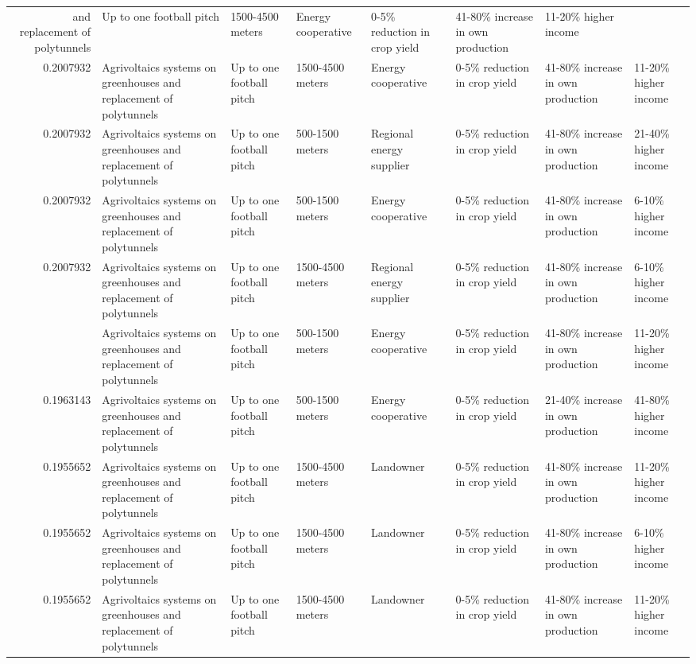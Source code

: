 \begin{table}
\begin{tabular}[t]{rlllllll}
and replacement of polytunnels & Up to one football pitch & 1500-4500 meters & Energy cooperative & 0-5\% reduction in crop yield & 41-80\% increase in own production & 11-20\% higher income\\
0.2007932 & Agrivoltaics systems on greenhouses
and replacement of polytunnels & Up to one football pitch & 1500-4500 meters & Energy cooperative & 0-5\% reduction in crop yield & 41-80\% increase in own production & 11-20\% higher income\\
0.2007932 & Agrivoltaics systems on greenhouses
and replacement of polytunnels & Up to one football pitch & 500-1500 meters & Regional energy supplier & 0-5\% reduction in crop yield & 41-80\% increase in own production & 21-40\% higher income\\
0.2007932 & Agrivoltaics systems on greenhouses
and replacement of polytunnels & Up to one football pitch & 500-1500 meters & Energy cooperative & 0-5\% reduction in crop yield & 41-80\% increase in own production & 6-10\% higher income\\
0.2007932 & Agrivoltaics systems on greenhouses
and replacement of polytunnels & Up to one football pitch & 1500-4500 meters & Regional energy supplier & 0-5\% reduction in crop yield & 41-80\% increase in own production & 6-10\% higher income\\
\addlinespace
0.2007932 & Agrivoltaics systems on greenhouses
and replacement of polytunnels & Up to one football pitch & 500-1500 meters & Energy cooperative & 0-5\% reduction in crop yield & 41-80\% increase in own production & 11-20\% higher income\\
0.1963143 & Agrivoltaics systems on greenhouses
and replacement of polytunnels & Up to one football pitch & 500-1500 meters & Energy cooperative & 0-5\% reduction in crop yield & 21-40\% increase in own production & 41-80\% higher income\\
0.1955652 & Agrivoltaics systems on greenhouses
and replacement of polytunnels & Up to one football pitch & 1500-4500 meters & Landowner & 0-5\% reduction in crop yield & 41-80\% increase in own production & 11-20\% higher income\\
0.1955652 & Agrivoltaics systems on greenhouses
and replacement of polytunnels & Up to one football pitch & 1500-4500 meters & Landowner & 0-5\% reduction in crop yield & 41-80\% increase in own production & 6-10\% higher income\\
0.1955652 & Agrivoltaics systems on greenhouses
and replacement of polytunnels & Up to one football pitch & 1500-4500 meters & Landowner & 0-5\% reduction in crop yield & 41-80\% increase in own production & 11-20\% higher income\\

\end{tabular}
\end{table}
